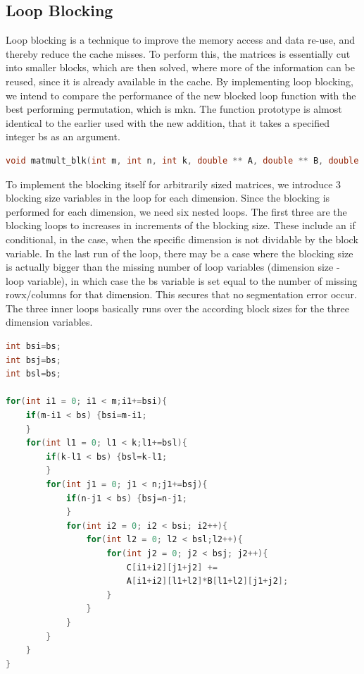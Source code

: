\subsection{Loop Blocking}

Loop blocking is a technique to improve the memory access and data re-use, and thereby reduce the cache misses. To perform this, the matrices is essentially cut into smaller blocks, which are then solved, where more of the information can be reused, since it is already available in the cache. By implementing loop blocking, we intend to compare the performance of the new blocked loop function with the best performing permutation, which is mkn. The function prototype is almost identical to the earlier used with the new addition, that it takes a specified integer bs as an argument.

\begin{lstlisting}[language=C++, caption=Blocked blk Prototype]
void matmult_blk(int m, int n, int k, double ** A, double ** B, double ** C, int bs)
\end{lstlisting}

To implement the blocking itself for arbitrarily sized matrices, we introduce 3 blocking size variables in the loop for each dimension. Since the blocking is performed for each dimension, we need six nested loops. The first three are the blocking loops to increases in increments of the blocking size. These include an if conditional, in the case, when the specific dimension is not dividable by the block variable. In the last run of the loop, there may be a case where the blocking size is actually bigger than the missing number of loop variables (dimension size - loop variable), in which case the bs variable is set equal to the number of missing rowx/columns for that dimension. This secures that no segmentation error occur.\\

The three inner loops basically runs over the according block sizes for the three dimension variables.

\begin{lstlisting}[language=C++, caption=Blocked Loop Function]
int bsi=bs;
int bsj=bs;
int bsl=bs;

for(int i1 = 0; i1 < m;i1+=bsi){
	if(m-i1 < bs) {bsi=m-i1;
	}
	for(int l1 = 0; l1 < k;l1+=bsl){
		if(k-l1 < bs) {bsl=k-l1;
		}
		for(int j1 = 0; j1 < n;j1+=bsj){
			if(n-j1 < bs) {bsj=n-j1;
			}
			for(int i2 = 0; i2 < bsi; i2++){	
				for(int l2 = 0; l2 < bsl;l2++){	
					for(int j2 = 0; j2 < bsj; j2++){	
						C[i1+i2][j1+j2] += 
						A[i1+i2][l1+l2]*B[l1+l2][j1+j2];
					}
				}
			}
		}
	}
}
\end{lstlisting}

